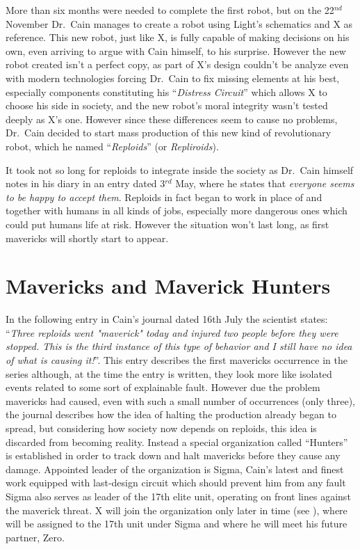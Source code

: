 More than six months were needed to complete the first robot, but on the 22$^{nd}$ November Dr.~Cain manages to create a robot using Light's schematics and X as reference. This new robot, just like X, is fully capable of making decisions on his own, even arriving to argue with Cain himself, to his surprise. However the new robot created isn't a perfect copy, as part of X's design couldn't be analyze even with modern technologies forcing Dr.~Cain to fix missing elements at his best, especially components constituting his ``\emph{Distress Circuit}''\cite{book:RMZ_Complete_works} which allows X to choose his side in society, and the new robot's moral integrity wasn't tested deeply as X's one. However since these differences seem to cause no problems, Dr.~Cain decided to start mass production of this new kind of revolutionary robot, which he named ``\emph{Reploids}''  (or \emph{Repliroids}).

It took not so long for reploids to integrate inside the society as Dr.~Cain himself notes in his diary in an entry dated 3$^{rd}$ May, where he states that \textit{everyone seems to be happy to accept them}. Reploids in fact began to work in place of and together with humans in all kinds of jobs, especially more dangerous ones which could put humans life at risk. However the situation won't last long,  as first mavericks will shortly start to appear.

\section{Mavericks and Maverick Hunters}

In the following entry in Cain's journal dated 16th July the scientist states: ``\textit{Three reploids went "maverick" today and injured two people before they were stopped. This is the third instance of this type of behavior and I still have no idea of what is causing it!}''. This entry describes the first mavericks occurrence in the series although, at the time the entry is written, they look more like isolated events related to some sort of explainable fault. However due the problem mavericks had caused, even with such a small number of occurrences (only three), the journal describes how the idea of halting the production already began to spread, but considering how society now depends on reploids, this idea is discarded from becoming reality. Instead a special organization called ``Hunters'' is  established in order to track down and halt mavericks before they cause any damage. Appointed leader of the organization is Sigma, Cain's latest and finest work equipped with last-design circuit which should prevent him from any fault Sigma also serves as leader of the 17th elite unit, operating on front lines against the maverick threat. X will join the organization only later in time (see \PtIIWarning), where will be assigned to the 17th unit under Sigma and where he will meet his future partner, Zero. 

